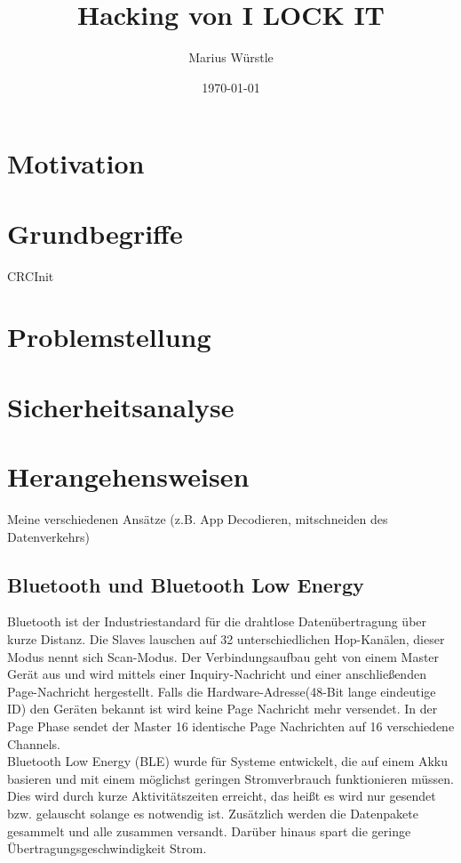 \documentclass[a4paper,11pt,singlespacing]{article}
\title{Hacking von I LOCK IT}
\author{Marius Würstle}
\date{\today}
\begin{document}
	\setlength{\parindent}{0ex}
	\maketitle
	
	\tableofcontents
	\pagebreak
	
	\section{Motivation}
	
	\section{Grundbegriffe}
		CRCInit
		
	
	\section{Problemstellung}
	
	\section{Sicherheitsanalyse}
	
	\section{Herangehensweisen}
		Meine verschiedenen Ansätze (z.B. App Decodieren, mitschneiden des Datenverkehrs)
			
	\subsection{Bluetooth und Bluetooth Low Energy}
		Bluetooth ist der Industriestandard für die drahtlose Datenübertragung über kurze Distanz. Die Slaves lauschen auf 32 unterschiedlichen Hop-Kanälen, dieser Modus nennt sich Scan-Modus. Der Verbindungsaufbau geht von einem Master Gerät aus und wird mittels einer Inquiry-Nachricht und einer anschließenden Page-Nachricht hergestellt. Falls die Hardware-Adresse(48-Bit lange eindeutige ID) den Geräten bekannt ist wird keine Page Nachricht mehr versendet. In der Page Phase sendet der Master 16 identische Page Nachrichten auf 16 verschiedene Channels. \\
		Bluetooth Low Energy (BLE) wurde für Systeme entwickelt, die auf einem Akku basieren und mit einem möglichst geringen Stromverbrauch funktionieren müssen. Dies wird durch kurze Aktivitätszeiten erreicht, das heißt es wird nur gesendet bzw. gelauscht solange es notwendig ist. Zusätzlich werden die Datenpakete gesammelt und alle zusammen versandt. Darüber hinaus spart die geringe Übertragungsgeschwindigkeit Strom.
		
\end{document}
